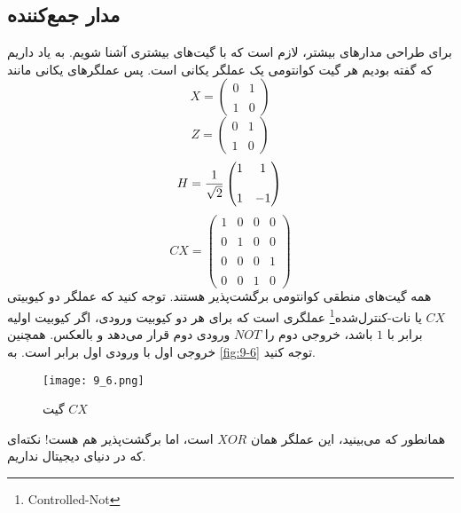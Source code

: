 \subsection{مدار جمع‌کننده}
برای طراحی مدارهای بیشتر، لازم است که با گیت‌های بیشتری آشنا شویم. به یاد داریم که گفته بودیم هر گیت کوانتومی یک عملگر یکانی است. پس عملگرهای یکانی مانند 
\begin{equation}
	  X = \begin{pmatrix} 0 & 1 \\ \\ 1 & 0 \end{pmatrix} 
\end{equation}
\begin{equation}
	  Z = \begin{pmatrix} 0 & 1 \\ \\ 1 & 0 \end{pmatrix} 
	\end{equation}
\begin{equation}
	  H =\frac{1}{\sqrt{2}} \begin{pmatrix} 1 & 1 \\ \\ 1 & -1 \end{pmatrix}  \\
\end{equation}
\begin{equation}
	 CX = \begin{pmatrix} 1 & 0 & 0 & 0 \\ \\ 0 & 1 & 0 & 0 \\ \\ 0 & 0 & 0 & 1 \\ \\ 0 & 0 & 1 & 0 \end{pmatrix}
\end{equation}
همه گیت‌های منطقی کوانتومی برگشت‌پذیر هستند. توجه کنید که عملگر دو کیوبیتی $CX$ یا نات-کنترل‌شده\footnote{Controlled-Not} عملگری است که برای هر دو کیوبیت ورودی، اگر کیوبیت اولیه برابر با $1$ باشد، خروجی دوم را $NOT$ ورودی دوم قرار می‌دهد و بالعکس. همچنین خروجی اول با ورودی اول برابر است. به  \autoref{fig:9-6} توجه کنید. ِ
\begin{figure}[h]
	\caption{گیت $CX$}
	\centering
	\texttt{[image: 9\_6.png]}
	\label{fig:9-6}
\end{figure}
همانطور که می‌بینید، این عملگر همان $XOR$ است، اما برگشت‌پذیر هم هست‌! نکته‌ای که در دنیای دیجیتال نداریم. 

